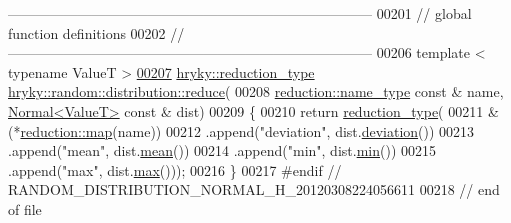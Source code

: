 \begin{DoxyCode}
{      ------------------------------------------------------------------------------}
00201 \textcolor{comment}{// global function definitions}
00202 \textcolor{comment}{//
      ------------------------------------------------------------------------------}
00206 \textcolor{comment}{}\textcolor{keyword}{template} < \textcolor{keyword}{typename} ValueT >
\hypertarget{random__distribution__normal_8h_source_l00207}{}\hyperlink{namespacehryky_1_1random_1_1distribution_a036b49db88fa8504b2a893ce60f9ad03}{00207} \hyperlink{classhryky_1_1_intrusive_ptr}{hryky::reduction_type} \hyperlink{namespacehryky_1_1random_1_1distribution_a036b49db88fa8504b2a893ce60f9ad03}{hryky::random::distribution::reduce}(
00208     \hyperlink{classhryky_1_1reduction_1_1_string}{reduction::name_type} \textcolor{keyword}{const} & name, \hyperlink{classhryky_1_1random_1_1distribution_1_1_normal}{Normal<ValueT>} \textcolor{keyword}{const} & dist)
00209 \{
00210     \textcolor{keywordflow}{return} \hyperlink{namespacehryky_a343a9a4c36a586be5c2693156200eadc}{reduction_type}(
00211         &(*\hyperlink{namespacehryky_1_1reduction_ac5eae270cf8047b294dc4ff3e5e11a79}{reduction::map}(name))
00212         .append(\textcolor{stringliteral}{"deviation"},    dist.\hyperlink{classhryky_1_1random_1_1distribution_1_1_normal_a421514c36ee40e90a9de30917ca6af08}{deviation}())
00213         .append(\textcolor{stringliteral}{"mean"},         dist.\hyperlink{classhryky_1_1random_1_1distribution_1_1_normal_acc11e24dbfb6d8250aea4400e84e7d5a}{mean}())
00214         .append(\textcolor{stringliteral}{"min"},          dist.\hyperlink{classhryky_1_1random_1_1distribution_1_1_normal_a133dc9d1669f90c4a9d55fca3b7be4b3}{min}())
00215         .append(\textcolor{stringliteral}{"max"},          dist.\hyperlink{classhryky_1_1random_1_1distribution_1_1_normal_aef11b7363a00e38dee7a7a751af8666f}{max}()));
00216 \}
00217 \textcolor{preprocessor}{#endif // RANDOM\_DISTRIBUTION\_NORMAL\_H\_20120308224056611}
00218 \textcolor{preprocessor}{}\textcolor{comment}{// end of file}
\end{DoxyCode}
